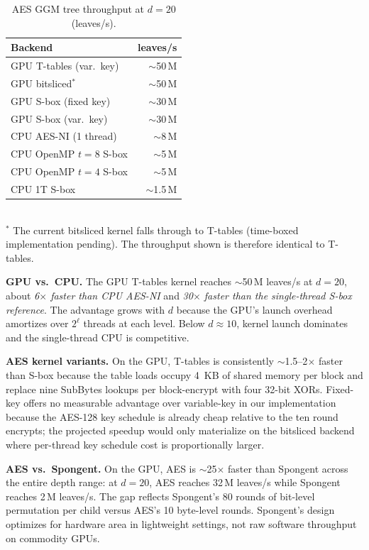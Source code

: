\documentclass[10pt,conference]{IEEEtran}
\begin{document}
\begin{table}[t]
\centering
\caption{AES GGM tree throughput at $d{=}20$ (leaves/s).}
\label{tab:throughput}
\begin{tabular}{lr}
\toprule
Backend & leaves/s \\
\midrule
GPU T-tables (var.~key) & $\sim$50\,M \\
GPU bitsliced$^\ast$    & $\sim$50\,M \\
GPU S-box (fixed key)   & $\sim$30\,M \\
GPU S-box (var.~key)    & $\sim$30\,M \\
CPU AES-NI (1 thread)   & $\sim$8\,M  \\
CPU OpenMP $t{=}8$ S-box & $\sim$5\,M \\
CPU OpenMP $t{=}4$ S-box & $\sim$5\,M \\
CPU 1T S-box            & $\sim$1.5\,M \\
\bottomrule
\end{tabular}
\\[2pt]
\footnotesize $^\ast$ The current bitsliced kernel falls through to T-tables
(time-boxed implementation pending). The throughput shown is therefore
identical to T-tables.
\end{table}

\textbf{GPU vs.\ CPU.} The GPU T-tables kernel reaches $\sim$50\,M leaves/s
at $d{=}20$, about \emph{6$\times$ faster than CPU AES-NI} and \emph{30$\times$
faster than the single-thread S-box reference}. The advantage grows with
$d$ because the GPU's launch overhead amortizes over $2^\ell$ threads at
each level. Below $d{\approx}10$, kernel launch dominates and the
single-thread CPU is competitive.

\textbf{AES kernel variants.} On the GPU, T-tables is consistently
$\sim$1.5--2$\times$ faster than S-box because the table loads occupy 4~KB
of shared memory per block and replace nine SubBytes lookups per block-encrypt
with four 32-bit XORs. Fixed-key offers no measurable advantage over
variable-key in our implementation because the AES-128 key schedule is
already cheap relative to the ten round encrypts; the projected speedup
would only materialize on the bitsliced backend where per-thread key
schedule cost is proportionally larger.

\textbf{AES vs.\ Spongent.} On the GPU, AES is $\sim$25$\times$ faster than
Spongent across the entire depth range: at $d{=}20$, AES reaches 32\,M leaves/s
while Spongent reaches 2\,M leaves/s. The gap reflects Spongent's 80 rounds
of bit-level permutation per child versus AES's 10 byte-level rounds.
Spongent's design optimizes for hardware area in lightweight settings,
not raw software throughput on commodity GPUs.
\end{document}
